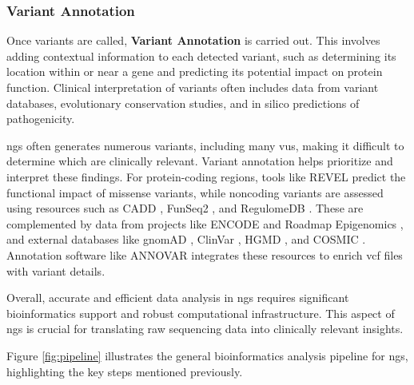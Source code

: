 \subsubsection{\textbf{Variant Annotation}} \label{subsubsec:ngs_annotation}
Once variants are called, \textbf{Variant Annotation} is carried out. This involves adding contextual information to each detected variant, such as determining its location within or near a gene and predicting its potential impact on protein function. Clinical interpretation of variants often includes data from variant databases, evolutionary conservation studies, and in silico predictions of pathogenicity. \cite{Rehm2013} 

\ac{ngs} often generates numerous variants, including many \ac{vus}, making it difficult to determine which are clinically relevant. Variant annotation helps prioritize and interpret these findings. For protein-coding regions, tools like REVEL \cite{REVEL} predict the functional impact of missense variants, while noncoding variants are assessed using resources such as CADD \cite{CADD}, FunSeq2 \cite{FunSeq2}, and RegulomeDB \cite{RegulomeDB}. These are complemented by data from projects like ENCODE \cite{ENCODE} and Roadmap Epigenomics \cite{REC}, and external databases like gnomAD \cite{gnomAD}, ClinVar \cite{ClinVar}, HGMD \cite{HGMD}, and COSMIC \cite{COSMIC}. Annotation software like ANNOVAR \cite{ANNOVAR} integrates these resources to enrich \ac{vcf} files with variant details. \cite{Larson2023}

Overall, accurate and efficient data analysis in \ac{ngs} requires significant bioinformatics support and robust computational infrastructure. This aspect of \ac{ngs} is crucial for translating raw sequencing data into clinically relevant insights.

Figure \ref{fig:pipeline} illustrates the general bioinformatics analysis pipeline for \ac{ngs}, highlighting the key steps mentioned previously.


